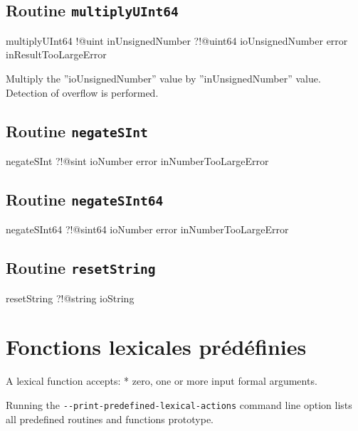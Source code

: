 \subsection{Routine \texttt{multiplyUInt64}}

\begin{galgas}
multiplyUInt64 !@uint inUnsignedNumber
               ?!@uint64 ioUnsignedNumber
               error inResultTooLargeError
\end{galgas}

Multiply the ''ioUnsignedNumber'' value by ''inUnsignedNumber'' value. Detection of overflow is performed.

\subsection{Routine \texttt{negateSInt}}

\begin{galgas}
negateSInt ?!@sint ioNumber
           error inNumberTooLargeError
\end{galgas}

\subsection{Routine \texttt{negateSInt64}}

\begin{galgas}
negateSInt64 ?!@sint64 ioNumber
             error inNumberTooLargeError
\end{galgas}


\subsection{Routine \texttt{resetString}}

\begin{galgas}
resetString ?!@string ioString
\end{galgas}








\section{Fonctions lexicales prédéfinies}


A lexical function accepts:
  * zero, one or more input formal arguments.

Running the \texttt{-{}-print-predefined-lexical-actions} command line option lists all predefined routines and functions prototype.

